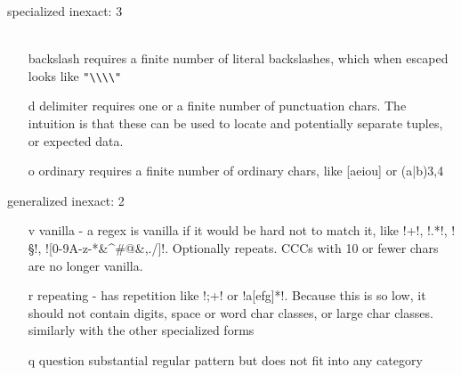 specialized inexact: 3
\begin{itemize}
\item[ \\ ] backslash  requires a finite number of literal backslashes, which when escaped looks like \verb!"\\\\"!
\item[ d ] delimiter requires one or a finite number of punctuation chars.  The intuition is that these can be used to locate and potentially separate tuples, or expected data.
\item[ o ] ordinary   requires a finite number of ordinary chars, like [aeiou] or (a|b){3,4}
\end{itemize}


generalized inexact: 2
\begin{itemize}
\item[ v ] vanilla - a regex is vanilla if it would be hard not to match it, like \cverb!\w+!, \cverb!.*!, \cverb!\S!, \cverb![0-9A-z-*&^#@&,./]!.  Optionally repeats.  CCCs with 10 or fewer chars are no longer vanilla.
\item[ r ] repeating - has repetition like \cverb!;+! or \cverb!a[efg]*!.  Because this is so low, it should not contain digits, space or word char classes, or large char classes.
similarly with the other specialized forms
\end{itemize}

\begin{itemize}
\item[ q ] question    substantial regular pattern but does not fit into any category
\end{itemize}































